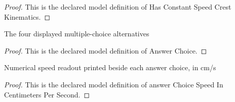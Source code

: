 \begin{proof}
  This is the declared model definition of Has Constant Speed Crest Kinematics.
\end{proof}
\begin{definition}
  \label{def:physics:phyx-mini-0301:phyxminiproblems-problemphyxmini0301-answerchoice}
  The four displayed multiple-choice alternatives
\end{definition}
\begin{proof}
  This is the declared model definition of Answer Choice.
\end{proof}
\begin{definition}
  \label{def:physics:phyx-mini-0301:phyxminiproblems-problemphyxmini0301-answerchoicespeedincentimeterspersecond}
  Numerical speed readout printed beside each answer choice, in cm/s
\end{definition}
\begin{proof}
  This is the declared model definition of answer Choice Speed In Centimeters Per Second.
\end{proof}
